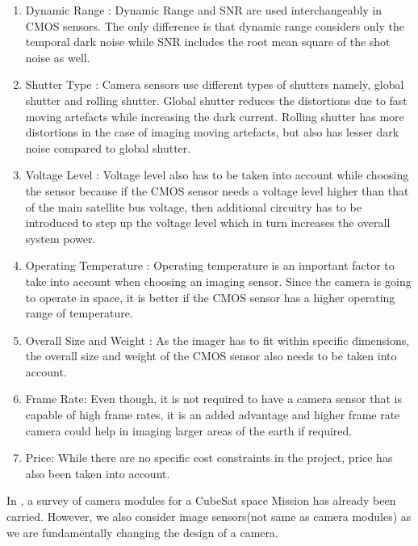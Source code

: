 \begin{enumerate}
\item Dynamic Range : Dynamic Range and SNR are used interchangeably in CMOS sensors. The only difference is that dynamic range considers only the temporal dark noise while SNR includes the root mean square of the shot noise as well.  

\item Shutter Type : Camera sensors use different types of shutters namely, global shutter and rolling shutter. Global shutter reduces the distortions due to fast moving artefacts while increasing the dark current. Rolling shutter has more distortions in the case of imaging moving artefacts, but also has lesser dark noise compared to global shutter. 

\item Voltage Level : Voltage level also has to be taken into account while choosing the sensor because if the CMOS sensor needs a voltage level higher than that of the main satellite bus voltage, then additional circuitry has to be introduced to step up the voltage level which in turn increases the overall system power.  

\item Operating Temperature : Operating temperature is an important factor to take into account when choosing an imaging sensor. Since the camera is going to operate in space, it is better if the CMOS sensor has a higher operating range of temperature. 

\item Overall Size and Weight : As the imager has to fit within specific dimensions, the overall size and weight of the CMOS sensor also needs to be taken into account.

\item Frame Rate: Even though, it is not required to have a camera sensor that is capable of high frame rates, it is an added advantage and higher frame rate camera could help in imaging larger areas of the earth if required. 
\item Price: While there are no specific cost constraints in the project, price has also been taken into account.
\end{enumerate}

In \cite{surveyCamMod}, a survey of camera modules for a CubeSat space Mission has already been carried. However, we also consider image sensors(not same as camera modules) as we are fundamentally changing the design of a camera. 


